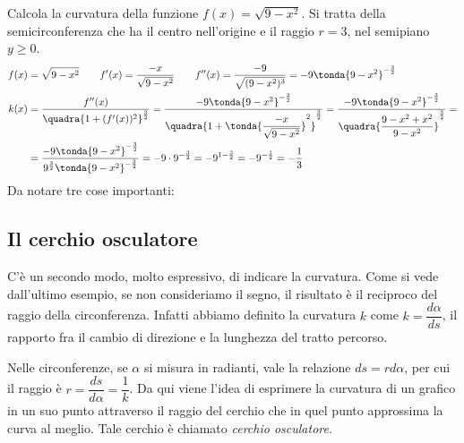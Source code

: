 \begin{esempio}
 Calcola la curvatura della funzione \(f(x)=\sqrt{9-x^2}\). Si tratta della 
semicirconferenza che ha il centro nell'origine e il raggio \(r=3\), nel 
semipiano \(y\geqslant 0\).
\begin{align*}
f(x) &= \sqrt{9-x^2} \qquad f'(x)=\dfrac{-x}{\sqrt{9-x^2}} 
\qquad f''(x)=\dfrac{-9}{\sqrt{(9-x^2)^3}}=-9\tonda{9-x^2}^{-\frac{3}{2}}\\
k(x)&=\dfrac{f''(x)}{\quadra{1+(f'(x))^2}^{\frac{3}{2}}}=
\dfrac{-9\tonda{9-x^2}^{-\frac{3}{2}}}
{\quadra{1+\tonda{\dfrac{-x}{\sqrt{9-x^2}}}^2}^\frac{3}{2}}=
\dfrac{-9\tonda{9-x^2}^{-\frac{3}{2}}}
{\quadra{\dfrac{9-x^2+x^2}{9-x^2}}^\frac{3}{2}}=\\
&=\dfrac{-9\tonda{9-x^2}^{-\frac{3}{2}}}
{9^\frac{3}{2}\tonda{9-x^2}^{-\frac{3}{2}}}=
-9\cdot9^{-\frac{3}{2}}=- 9^{1-\frac{3}{2}}=-9^{-\frac{1}{2}}=-\dfrac{1}{3}
\end{align*}
Da notare tre cose importanti:

\end{esempio}

\pagebreak %

\subsection{Il cerchio osculatore}
C'è un secondo modo, molto espressivo, di indicare la curvatura. Come si vede 
dall'ultimo esempio, se non consideriamo il segno, il risultato è il reciproco 
del raggio della circonferenza. Infatti abbiamo definito la curvatura \(k\) 
come \(k=\dfrac{d\alpha}{ds}\), il rapporto fra il cambio di direzione e la 
lunghezza del tratto percorso.

Nelle circonferenze, se \(\alpha\) si misura in radianti, vale la relazione 
\(ds=rd\alpha\), per cui il raggio è \(r=\dfrac{ds}{d\alpha}=\dfrac{1}{k}\). Da 
qui viene l'idea di esprimere la curvatura di un grafico in un suo punto 
attraverso il raggio del cerchio che in quel punto approssima la curva al 
meglio. Tale cerchio è chiamato \emph{cerchio osculatore}.

